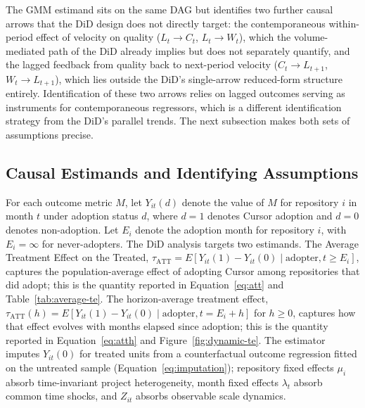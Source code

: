 The GMM estimand sits on the same DAG but identifies two further causal arrows that the DiD design does not directly target: the contemporaneous within-period effect of velocity on quality ($L_t \to C_t$, $L_t \to W_t$), which the volume-mediated path of the DiD already implies but does not separately quantify, and the lagged feedback from quality back to next-period velocity ($C_t \to L_{t+1}$, $W_t \to L_{t+1}$), which lies outside the DiD's single-arrow reduced-form structure entirely.
Identification of these two arrows relies on lagged outcomes serving as instruments for contemporaneous regressors, which is a different identification strategy from the DiD's parallel trends.
The next subsection makes both sets of assumptions precise.

\subsection{Causal Estimands and Identifying Assumptions}
\label{sec:cursor-credibility-estimand}

For each outcome metric $M$, let $Y_{it}(d)$ denote the value of $M$ for repository $i$ in month $t$ under adoption status $d$, where $d=1$ denotes Cursor adoption and $d=0$ denotes non-adoption.
Let $E_i$ denote the adoption month for repository $i$, with $E_i = \infty$ for never-adopters.
The DiD analysis targets two estimands.
The Average Treatment Effect on the Treated, $\tau_{\text{ATT}} = E[Y_{it}(1) - Y_{it}(0) \mid \text{adopter}, t \geq E_i]$, captures the population-average effect of adopting Cursor among repositories that did adopt; this is the quantity reported in Equation~\ref{eq:att} and Table~\ref{tab:average-te}.
The horizon-average treatment effect, $\tau_{\text{ATT}}(h) = E[Y_{it}(1) - Y_{it}(0) \mid \text{adopter}, t = E_i + h]$ for $h \geq 0$, captures how that effect evolves with months elapsed since adoption; this is the quantity reported in Equation~\ref{eq:atth} and Figure~\ref{fig:dynamic-te}.
The \citet{borusyak2024revisiting} estimator imputes $Y_{it}(0)$ for treated units from a counterfactual outcome regression fitted on the untreated sample (Equation~\ref{eq:imputation}); repository fixed effects $\mu_i$ absorb time-invariant project heterogeneity, month fixed effects $\lambda_t$ absorb common time shocks, and $Z_{it}$ absorbs observable scale dynamics.

